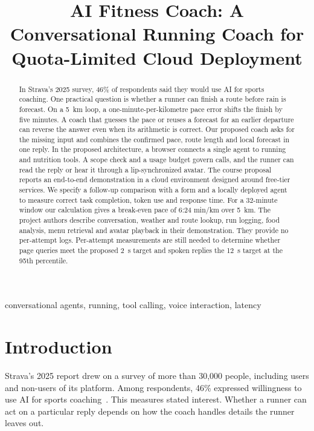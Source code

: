 \documentclass[conference]{IEEEtran}
\begin{document}
\title{AI Fitness Coach: A Conversational Running Coach for Quota-Limited Cloud Deployment}
\author{}
\maketitle
\begin{abstract}
In Strava's 2025 survey, 46\% of respondents said they would use AI for sports coaching. One practical question is whether a runner can finish a route before rain is forecast.
On a 5~km loop, a one-minute-per-kilometre pace error shifts the finish by five minutes. A coach that guesses the pace or reuses a forecast for an earlier departure can reverse the answer even when its arithmetic is correct.
Our proposed coach asks for the missing input and combines the confirmed pace, route length and local forecast in one reply.
In the proposed architecture, a browser connects a single agent to running and nutrition tools. A scope check and a usage budget govern calls, and the runner can read the reply or hear it through a lip-synchronized avatar.
The course proposal reports an end-to-end demonstration in a cloud environment designed around free-tier services. We specify a follow-up comparison with a form and a locally deployed agent to measure correct task completion, token use and response time.
For a 32-minute window our calculation gives a break-even pace of 6:24 min/km over 5~km. The project authors describe conversation, weather and route lookup, run logging, food analysis, menu retrieval and avatar playback in their demonstration. They provide no per-attempt logs. Per-attempt measurements are still needed to determine whether page queries meet the proposed 2~s target and spoken replies the 12~s target at the 95th percentile.
\end{abstract}
\begin{IEEEkeywords}
conversational agents, running, tool calling, voice interaction, latency
\end{IEEEkeywords}
\section{Introduction}
Strava's 2025 report drew on a survey of more than 30,000 people, including users and non-users of its platform. Among respondents, 46\% expressed willingness to use AI for sports coaching~\cite{strava}. This measures stated interest. Whether a runner can act on a particular reply depends on how the coach handles details the runner leaves out.
\end{document}
